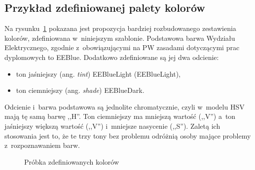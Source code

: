 \subsection{Przykład zdefiniowanej palety kolorów}
Na rysunku~\ref{rys:colorsample} pokazana jest propozycja bardziej rozbudowanego zestawienia kolorów, zdefiniowana w~niniejszym szablonie. Podstawowa barwa Wydziału Elektrycznego, zgodnie z~obowiązującymi na PW zasadami dotyczącymi prac dyplomowych to \textcolor{EEBlue}{EEBlue}. Dodatkowo zdefiniowane są jej dwa odcienie:
\begin{itemize}
    \item ton jaśniejszy (ang. \textit{tint}) \textcolor{EEBlueLight}{EEBlueLight} (EEBlueLight),
    \item ton ciemniejszy (ang. \textit{shade}) \textcolor{EEBlueDark}{EEBlueDark}.
\end{itemize}
Odcienie i~barwa podstawowa są jednolite chromatycznie, czyli w~modelu HSV mają tę samą barwę ,,H''. Ton ciemniejszy ma mniejszą wartość (,,V'') a~ton jaśniejszy większą wartość (,,V'') i~mniejsze nasycenie (,,S''). Zaletą ich stosowania jest to, że te trzy tony bez problemu odróżnią osoby mające problemy z~rozpoznawaniem barw. 

\begin{figure}[!ht]
    \centering
    \caption{Próbka zdefiniowanych kolorów}
    \label{rys:colorsample}
\end{figure}

